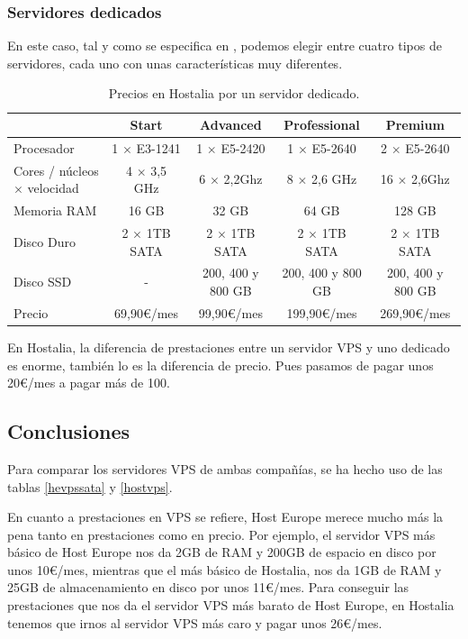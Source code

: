 \documentclass[10pt,a4paper,spanish]{article}
\numberwithin{equation}{section} %
\numberwithin{figure}{section} %
\numberwithin{table}{section} %
\begin{document}
\subsubsection{Servidores dedicados}
En este caso, tal y como se especifica en \cite{hse}, podemos elegir entre cuatro tipos de servidores, cada uno con unas características muy diferentes.

\begin{table}[!h]
\begin{tabular}{l | c | c | c | c}
 & Start & Advanced & Professional & Premium \\
 \hline
 Procesador & 1 $\times$ E3-1241 & 1 $\times$ E5-2420 & 1 $\times$ E5-2640 & 2 $\times$ E5-2640 \\
 Cores / núcleos $\times$ velocidad & 4 $\times$ 3,5 GHz & 6 $\times$ 2,2Ghz & 8 $\times$ 2,6 GHz & 16 $\times$ 2,6Ghz \\
 Memoria RAM & 16 GB & 32 GB & 64 GB & 128 GB \\
 Disco Duro & 2 $\times$ 1TB SATA & 2 $\times$ 1TB SATA & 2 $\times$ 1TB SATA & 2 $\times$ 1TB SATA\\
 Disco SSD & - & 200, 400 y 800 GB & 200, 400 y 800 GB & 200, 400 y 800 GB \\
 Precio & 69,90\euro/mes & 99,90\euro/mes & 199,90\euro/mes & 269,90\euro/mes \\
\end{tabular}
\caption{Precios en Hostalia por un servidor dedicado.}
\label{hostse}
\end{table}

En Hostalia, la diferencia de prestaciones entre un servidor VPS y uno dedicado es enorme, también lo es la diferencia de precio. Pues pasamos de pagar unos 20\euro/mes a pagar más de 100.

\subsection{Conclusiones}
Para comparar los servidores VPS de ambas compañías, se ha hecho uso de las tablas \hyperref[hevpssata]{\ref*{hevpssata}} y \hyperref[hostvps]{\ref*{hostvps}}.

En cuanto a prestaciones en VPS se refiere, Host Europe merece mucho más la pena tanto en prestaciones como en precio. Por ejemplo, el servidor VPS más básico de Host Europe nos da 2GB de RAM y 200GB de espacio en disco por unos 10\euro/mes, mientras que el más básico de Hostalia, nos da 1GB de RAM y 25GB de almacenamiento en disco por unos 11\euro/mes. Para conseguir las prestaciones que nos da el servidor VPS más barato de Host Europe, en Hostalia tenemos que irnos al servidor VPS más caro y pagar unos 26\euro/mes.
\end{document}
